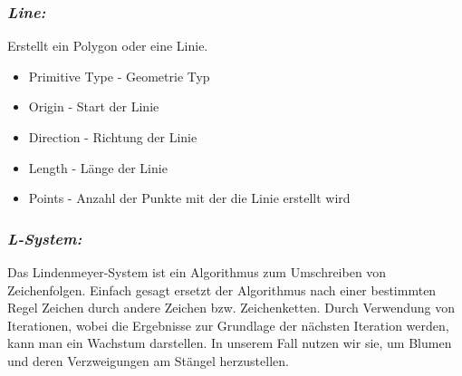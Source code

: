 \documentclass[paper=a4,fontsize=12pt,ngerman]{scrartcl}
\begin{document}
	\subsubsection*{\textit{Line:}}
	Erstellt ein Polygon oder eine Linie.
	\begin{itemize}
		\item Primitive Type - Geometrie Typ  
		\item Origin - Start der Linie
		\item Direction - Richtung der Linie
		\item Length - Länge der Linie
		\item Points - Anzahl der Punkte mit der die Linie erstellt wird
	\end{itemize}
	\subsubsection*{\textit{L-System:}}
	Das Lindenmeyer-System ist ein Algorithmus zum Umschreiben von Zeichenfolgen. Einfach gesagt ersetzt der Algorithmus nach einer bestimmten Regel Zeichen durch andere Zeichen bzw. Zeichenketten.
	Durch Verwendung von Iterationen, wobei die Ergebnisse zur Grundlage der nächsten Iteration werden, kann man ein Wachstum darstellen. In unserem Fall nutzen wir sie, um Blumen und deren Verzweigungen am Stängel herzustellen. 
\end{document}
